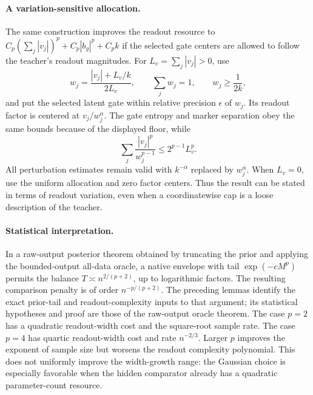 \paragraph{A variation-sensitive allocation.}
The same construction improves the readout resource to
$C_p(\sum_j|v_j|)^p+C_p|b_g|^p+C_pk$ if the selected gate centers are allowed to follow the teacher's readout magnitudes. For $L_v=\sum_j|v_j|>0$, use
\[
 w_j=\frac{|v_j|+L_v/k}{2L_v},\qquad
 \sum_jw_j=1,\qquad w_j\ge\frac1{2k},
\]
and put the selected latent gate within relative precision $\epsilon$ of $w_j$. Its readout factor is centered at $v_j/w_j^\alpha$. The gate entropy and marker separation obey the same bounds because of the displayed floor, while
\[
 \sum_j\frac{|v_j|^p}{w_j^{p-1}}
 \le 2^{p-1}L_v^p.
\]
All perturbation estimates remain valid with $k^{-\alpha}$ replaced by $w_j^\alpha$. When $L_v=0$, use the uniform allocation and zero factor centers. Thus the result can be stated in terms of readout variation, even when a coordinatewise cap is a loose description of the teacher.

\paragraph{Statistical interpretation.}
In a raw-output posterior theorem obtained by truncating the prior and applying the bounded-output all-data oracle, a native envelope with tail $\exp(-cM^p)$ permits the balance
$T\asymp n^{2/(p+2)}$, up to logarithmic factors. The resulting comparison penalty is of order $n^{-p/(p+2)}$. The preceding lemmas identify the exact prior-tail and readout-complexity inputs to that argument; its statistical hypotheses and proof are those of the raw-output oracle theorem. The case $p=2$ has a quadratic readout-width cost and the square-root sample rate. The case $p=4$ has quartic readout-width cost and rate $n^{-2/3}$. Larger $p$ improves the exponent of sample size but worsens the readout complexity polynomial. This does not uniformly improve the width-growth range: the Gaussian choice is especially favorable when the hidden comparator already has a quadratic parameter-count resource.
